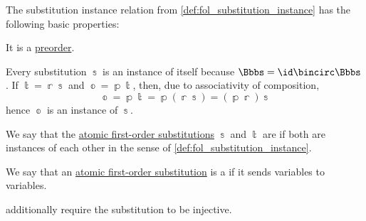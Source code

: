 \begin{proposition}\label{thm:def:fol_substitution_instance}
  The substitution instance relation from \cref{def:fol_substitution_instance} has the following basic properties:
  \begin{thmenum}
     It is a \hyperref[def:preordered_set]{preorder}.
  \end{thmenum}
\end{proposition}
\begin{comments}
   Every substitution \( \Bbbs \) is an instance of itself because \( \Bbbs = \id \bincirc \Bbbs \).
   If \( \Bbbt = \Bbbr\Bbbs \) and \( \Bbbo = \Bbbp\Bbbt \), then, due to associativity of composition,
  \begin{equation*}
    \Bbbo
    =
    \Bbbp\Bbbt
    =
    \Bbbp(\Bbbr\Bbbs)
    =
    (\Bbbp\Bbbr)\Bbbs
  \end{equation*}
  hence \( \Bbbo \) is an instance of \( \Bbbs \).
\end{comments}

\begin{definition}\label{def:fol_substitution_equivalence}\mimprovised
  We say that the \hyperref[def:atomic_fol_substitution]{atomic first-order substitutions} \( \Bbbs \) and \( \Bbbt \) are  if both are instances of each other in the sense of \cref{def:fol_substitution_instance}.
\end{definition}

\begin{definition}\label{def:fol_renaming_substitution}
  We say that an \hyperref[def:atomic_fol_substitution]{atomic first-order substitution} is a  if it sends variables to variables.
\end{definition}
\begin{comments}
  \item \Textcite*[39]{BaaderNipkow2012TermRewriting} additionally require the substitution to be injective.
\end{comments}

